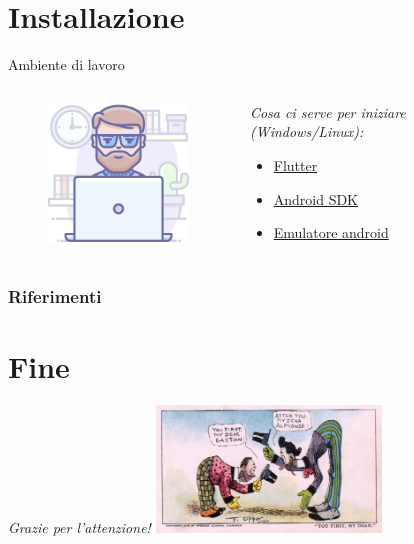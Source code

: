 \documentclass{../libs/presentation_format}
\begin{document}
\section{Installazione}
\begin{frame}{Ambiente di lavoro}
	\begin{minipage}[0.2\textheight]{\textwidth}
		\begin{columns}[T]
			\begin{column}{0.4\textwidth}
				\begin{figure}[htpb]
					\centering
					\includegraphics[width=4cm]{../libs/Developer-Friendly.png}
				\end{figure}
			\end{column}
			\begin{column}{0.6\textwidth}
				\emph{Cosa ci serve per iniziare (Windows/Linux): }
				\newline
				\begin{itemize}
					\item \href{https://docs.flutter.dev/get-started/install}{Flutter}
					\item \href{https://docs.flutter.dev/get-started/install}{Android SDK}
					\item \href{https://docs.flutter.dev/get-started/install}{Emulatore android}
				\end{itemize}
			\end{column}
		\end{columns}
	\end{minipage}
\end{frame}


\begin{frame}[allowframebreaks]
    \frametitle{Riferimenti}
    \printbibliography
\end{frame}

\section{Fine}
\begin{frame}{}
	\huge\emph{Grazie per l'attenzione!}
	\newline
	\vfill
	\hfill\includegraphics[width=6cm]{../libs/alphonse-gaston-regards}
\end{frame}
\end{document}
